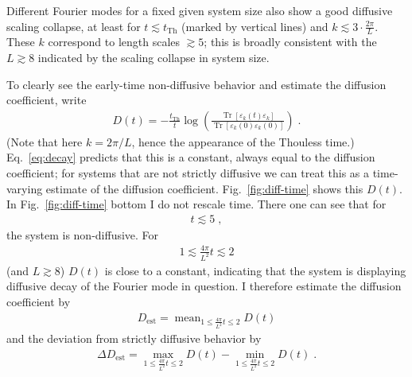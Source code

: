\documentclass[aps,prb,nofootinbib,twocolumn,balancelastpage,amsmath,amssymb,floatfix,superscriptaddress,]{revtex4-1}
\newcommand{\tr}{\operatorname{Tr}}
\DeclareMathOperator*{\mean}{mean}
\newcommand{\Th}{{\mathrm{Th}}}
\begin{document}
Different Fourier modes for a fixed given system size also show a good diffusive scaling collapse, at least for $t \lesssim t_\Th$ (marked by vertical lines) and $k \lesssim 3\cdot\frac{2\pi}{L}$.
These $k$ correspond to length scales $\gtrsim 5$;
this is broadly consistent with the $L \gtrsim 8$ indicated by the scaling collapse in system size.

To clearly see the early-time non-diffusive behavior and estimate the diffusion coefficient,
write
\begin{align}
  D(t) = - \frac{t_{\mathrm{Th}}} {t}  \log\left(\frac{\tr[\varepsilon_k(t)\varepsilon_k]}{\tr[\varepsilon_k(0)\varepsilon_k(0)]}\right)\;.
\end{align}
(Note that here $k = {2\pi }/L$, hence the appearance of the Thouless time.)
Eq.~\eqref{eq:decay} predicts that this is a constant, always equal to the diffusion coefficient;
for systems that are not strictly diffusive we can treat this as a time-varying estimate of the diffusion coefficient.
Fig.~\ref{fig:diff-time} shows this $D(t)$.
In Fig.~\ref{fig:diff-time} bottom I do not rescale time.
There one can see that for
\begin{align}
  t \lesssim 5\;,
\end{align}
the system is non-diffusive.
For
\begin{align}
  1 \lesssim  \frac{4\pi}{L^2} t \lesssim 2
\end{align}
(and $L \gtrsim 8$) $D(t)$ is close to a constant,
indicating that the system is displaying diffusive decay of the Fourier mode in question.
I therefore estimate the diffusion coefficient by
\begin{align}
  D_{\mathrm{est}} = \mean_{ 1 \le \frac{4\pi}{L^2} t \le 2} D(t)
\end{align}
and the deviation from strictly diffusive behavior by
\begin{align}
  \Delta D_{\mathrm{est}} = \max_{ 1 \le \frac{4\pi}{L^2} t \le 2} D(t) - \min_{ 1 \le \frac{4\pi}{L^2} t \le 2}  D(t)\;.
\end{align}
\end{document}

